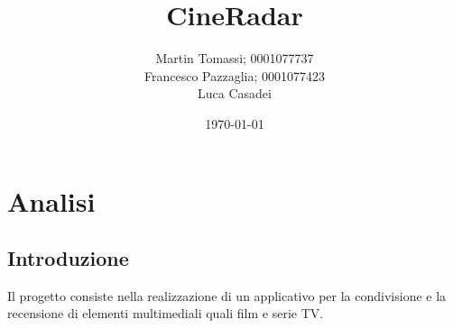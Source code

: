 \documentclass[a4paper,12pt]{report}
\title{\textbf{CineRadar}}
\author{Martin Tomassi; 0001077737\\Francesco Pazzaglia; 0001077423\\Luca Casadei}
\date{\today}
\begin{document}
	\maketitle
	\tableofcontents
	\chapter{Analisi}
	\section{Introduzione}
	Il progetto consiste nella realizzazione di un applicativo per la condivisione e la recensione di elementi multimediali quali film e serie TV.
\end{document}
